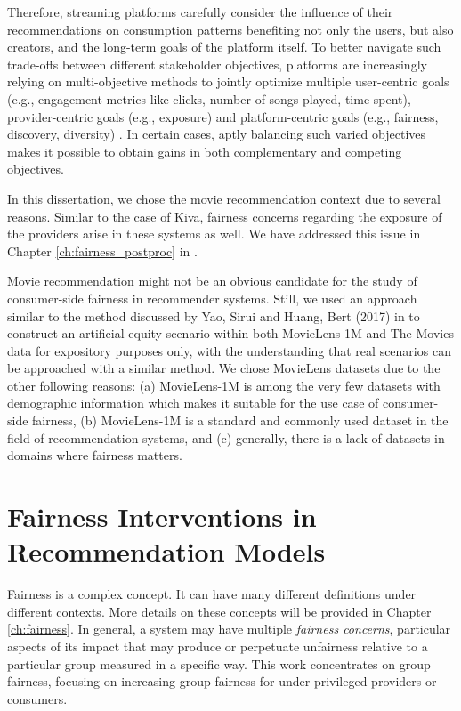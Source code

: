     Therefore, streaming platforms carefully consider the influence of their recommendations on consumption patterns benefiting not only the users, but also creators, and the long-term goals of the platform itself. To better navigate such trade-offs between different stakeholder objectives, platforms are increasingly relying on multi-objective methods to jointly optimize multiple user-centric goals (e.g., engagement metrics like clicks, number of songs played, time spent), provider-centric goals (e.g., exposure) and platform-centric goals (e.g., fairness, discovery, diversity) \cite{mehrotra2020bandit}. In certain cases, aptly balancing such varied objectives makes it possible to obtain gains in both complementary and competing objectives.
    
    In this dissertation, we chose the movie recommendation context due to several reasons. Similar to the case of Kiva, fairness concerns regarding the exposure of the providers arise in these systems as well. We have addressed this issue in Chapter \ref{ch:fairness_postproc} in \cite{sonboli2020opportunistic,liu2019farpfar}.
    
    
    Movie recommendation might not be an obvious candidate for the study of consumer-side fairness in recommender systems. Still, we used an approach similar to the method discussed by Yao, Sirui and Huang, Bert (2017) in \cite{yao2017beyond} to construct an artificial equity scenario within both MovieLens-1M and The Movies data for expository purposes only, with the understanding that real scenarios can be approached with a similar method. We chose MovieLens datasets due to the other following reasons: (a) MovieLens-1M is among the very few datasets with demographic information which makes it suitable for the use case of consumer-side fairness, (b) MovieLens-1M is a standard and commonly used dataset in the field of recommendation systems, and (c) generally, there is a lack of datasets in domains where fairness matters.


\section{Fairness Interventions in Recommendation Models}

    Fairness is a complex concept. It can have many different definitions under different contexts. More details on these concepts will be provided in Chapter \ref{ch:fairness}. In general, a system may have multiple \textit{fairness concerns}, particular aspects of its impact that may produce or perpetuate unfairness relative to a particular group measured in a specific way. This work concentrates on group fairness, focusing on increasing group fairness for under-privileged providers or consumers. %
    
